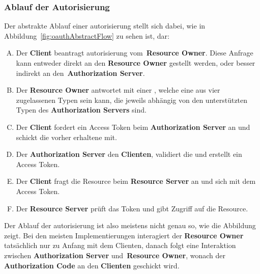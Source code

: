 	\subsubsection{Ablauf der Autorisierung}\label{subsubsec:ablauf-der-autorisierung}
		Der abstrakte Ablauf einer \gls{autorisierung} stellt sich dabei,
		wie in Abbildung~\ref{fig:oauthAbstractFlow} zu sehen ist, dar:
		\begin{enumerate}[(A)]
			\item Der \textbf{Client} beantragt \gls{autorisierung} vom~\textbf{Resource Owner}.
			Diese Anfrage kann entweder direkt an den \textbf{Resource Owner} gestellt werden,
			oder besser indirekt an den~\textbf{Authorization Server}.

			\item Der \textbf{Resource Owner} antwortet mit einer
			,
			welche eine aus vier zugelassenen Typen sein kann,
			die jeweils abhängig von den unterstützten Typen des \textbf{Authorization Servers} sind.

			\item Der \textbf{Client} fordert ein Access Token beim \textbf{Authorization Server} an
			und schickt die vorher erhaltene  mit.

			\item Der \textbf{Authorization Server} 
			den \textbf{Clienten},
			validiert die  und
			erstellt ein Access Token.

			\item Der \textbf{Client} fragt die Resource beim \textbf{Resource Server} an
			und  sich mit dem Access Token.

			\item Der \textbf{Resource Server} prüft das Token und gibt Zugriff auf die Resource.

		\end{enumerate}

		\bigskip\noindent
		Der Ablauf der \gls{autorisierung} ist also meistens nicht genau so,
		wie die Abbildung~ zeigt.
		Bei den meisten Implementierungen interagiert der \textbf{Resource Owner}
		tatsächlich nur zu Anfang mit dem Clienten,
		danach folgt eine Interaktion zwischen \textbf{Authorization Server} und~\textbf{Resource Owner},
		wonach der \textbf{Authorization Code} an den \textbf{Clienten} geschickt wird.
